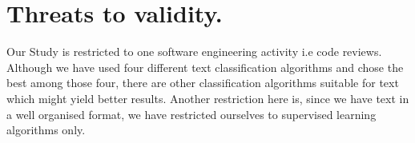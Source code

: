 \documentclass[conference]{IEEEtran}
\begin{document}










\section{Threats to validity.}

Our Study is restricted to one software engineering activity i.e code reviews. Although we have used four different text classification algorithms and chose the best among those four, there are other classification algorithms suitable for text which might yield better results. Another restriction here is, since we have text in a well organised format, we have restricted ourselves to supervised learning algorithms only. 
\end{document}
